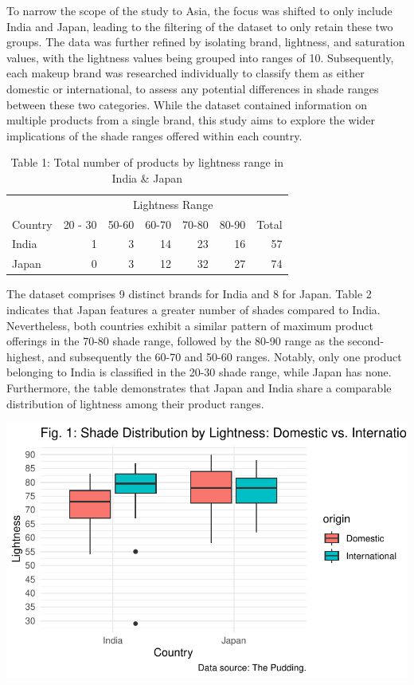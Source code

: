 \documentclass[
  letterpaper,
  DIV=11,
  numbers=noendperiod]{scrartcl}
\begin{document}
To narrow the scope of the study to Asia, the focus was shifted to only
include India and Japan, leading to the filtering of the dataset to only
retain these two groups. The data was further refined by isolating
brand, lightness, and saturation values, with the lightness values being
grouped into ranges of 10. Subsequently, each makeup brand was
researched individually to classify them as either domestic or
international, to assess any potential differences in shade ranges
between these two categories. While the dataset contained information on
multiple products from a single brand, this study aims to explore the
wider implications of the shade ranges offered within each country.

\begin{table}

\caption{Table 1: Total number of products by lightness range in India & Japan}
\centering
\begin{tabular}[t]{l|r|r|r|r|r|r}
\hline
\multicolumn{1}{c|}{ } & \multicolumn{6}{c}{Lightness Range} \\
\cline{2-7}
Country & 20 - 30 & 50-60 & 60-70 & 70-80 & 80-90 & Total\\
\hline
India & 1 & 3 & 14 & 23 & 16 & 57\\
\hline
Japan & 0 & 3 & 12 & 32 & 27 & 74\\
\hline
\end{tabular}
\end{table}

The dataset comprises 9 distinct brands for India and 8 for Japan. Table
2 indicates that Japan features a greater number of shades compared to
India. Nevertheless, both countries exhibit a similar pattern of maximum
product offerings in the 70-80 shade range, followed by the 80-90 range
as the second-highest, and subsequently the 60-70 and 50-60 ranges.
Notably, only one product belonging to India is classified in the 20-30
shade range, while Japan has none. Furthermore, the table demonstrates
that Japan and India share a comparable distribution of lightness among
their product ranges.

\includegraphics{paper_files/figure-pdf/unnamed-chunk-3-1.pdf}
\end{document}
